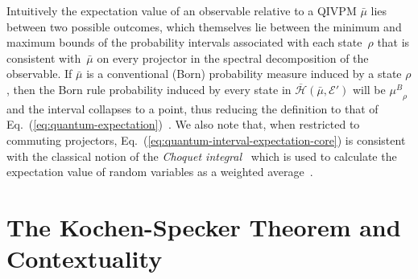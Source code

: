 \documentclass[english,reprint, aps, prl,superscriptaddress, showpacs,
showkeys, longbibliography, amsmath, amssymb, floatfix]{revtex4-1}
\theoremstyle{plain}
\theoremstyle{definition}
\newcommand{\Hilb}{\mathcal{H}}
\newcommand{\events}{\ensuremath{\mathcal{E}}}
\newcommand{\proj}[1]{\op{#1}{#1}}
\newcommand{\ps}{\texttt{+}}
\newcommand{\coreBorn}{\ensuremath{\overline{\Hilb}}}
\newcommand{\muB}{\ensuremath{\mu^{B}}}
\begin{document}
\noindent Intuitively the expectation value of an observable relative
to a QIVPM $\bar{\mu}$ lies between two possible outcomes, which
themselves lie between the minimum and maximum bounds of the
probability intervals associated with each state~$\rho$ that is
consistent with~$\bar{\mu}$ on every projector in the spectral
decomposition of the observable. If $\bar{\mu}$ is a conventional
(Born) probability measure induced by a state $\rho$, then the Born
rule probability induced by every state in
$\coreBorn\left(\bar{\mu},\events'\right)$ will be
$\muB_{\rho}$ and the interval collapses to a point, thus
reducing the definition to that of
Eq.~(\ref{eq:quantum-expectation})~\citep{TaiThesis2018}.
We also note that, when restricted to commuting projectors,
Eq.~(\ref{eq:quantum-interval-expectation-core}) is consistent with
the classical notion of the \emph{Choquet
  integral}~\citep{Choquet1954,GilboaSchmeidler1994,Grabisch2016}
which is used to calculate the expectation value of random variables
as a weighted average~\citep{TaiThesis2018}.

\section{The Kochen-Specker Theorem and Contextuality}
\label{sec:Kochen-Specker}
  
\end{document}
